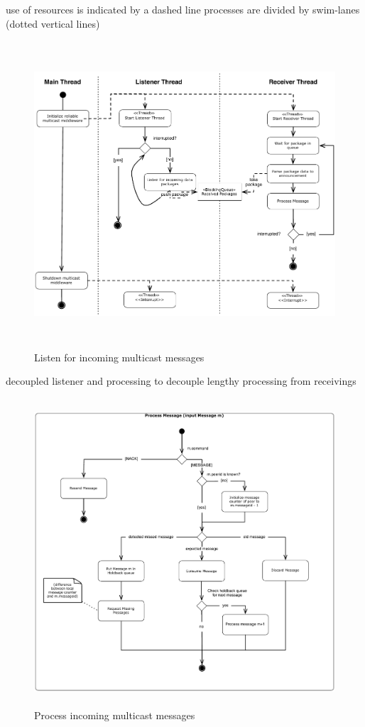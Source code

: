 use of resources  is indicated by a dashed line 
processes are divided by swim-lanes (dotted vertical lines)

\begin{figure}[htbp]
    \centering
        \includegraphics[height=4.5in]{figures/receivePackets.pdf}
    \caption{Listen for incoming multicast messages}
    \label{fig:figures_processReceivePackage}
\end{figure}

decoupled listener and processing to decouple lengthy processing from receivings

\begin{figure}[htbp]
    \centering
        \includegraphics[height=4.5in]{figures/processMessages.pdf}
    \caption{Process incoming multicast messages}
    \label{fig:figures_processMessages}
\end{figure}

